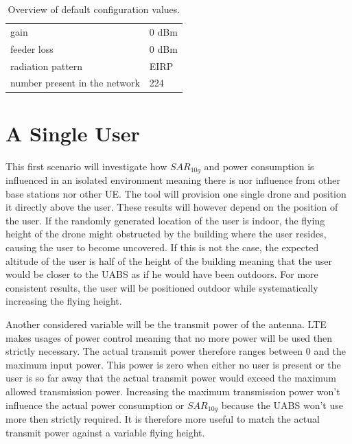 \begin{table}[!htb]
\begin{tabular}[t]{ll}
        \hspace{3mm} gain                      & 0 dBm   \\ 
        \hspace{3mm} feeder loss               & 0 dBm   \\ 
        \hspace{3mm} radiation pattern         & \acs{EIRP}  \\
        \hspace{3mm} number present in the network         & 224  \\
        \toprule
\end{tabular}
\caption{Overview of default configuration values.}
\label{table:defaultconf}
\end{table}

\section{A Single User}
\label{sec:s1}

This first scenario will investigate how $SAR_{10g}$ and power consumption is influenced in an isolated environment meaning there is nor influence 
from other base stations nor other \gls{UE}. The tool will provision one single drone and position it directly above the user.
These results will however depend on the position of the user. If the randomly generated location of the user is indoor, 
the flying height of the drone might obstructed by the building where the user resides, causing the user to become uncovered. If this is not the case,
the expected altitude of the user is half of the height of the building meaning that the user would be closer to the \gls{UABS} as 
if he would have been outdoors. For more consistent results, the user will be positioned outdoor while systematically 
increasing the flying height. 

Another considered variable will be the transmit power of the antenna.
\gls{LTE} makes usages of power control meaning that no more power will be used then strictly necessary. The actual 
transmit power therefore ranges between 0 and the maximum input power. This power is zero when either no user is 
present or the user is so far away that the actual transmit power would exceed the maximum allowed transmission power.
Increasing the maximum transmission power won't influence the actual power consumption or $SAR_{10g}$ because the \gls{UABS} won't use more
then strictly required. It is therefore more useful to match the actual transmit power against a variable flying height.

